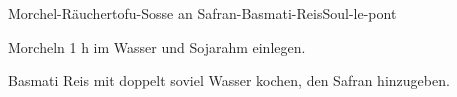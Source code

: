 
\begin{recipe}[]{Morchel-R\"auchertofu-Sosse an Safran-Basmati-Reis}{Soul-le-pont}{}



\step
Morcheln 1 h im Wasser und Sojarahm einlegen.

\step
Basmati Reis mit doppelt soviel Wasser kochen, den Safran hinzugeben.

\end{recipe}